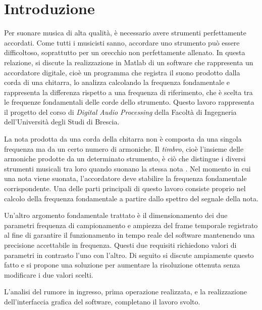 \chapter{Introduzione}

Per suonare musica di alta qualità, è necessario avere strumenti perfettamente accordati.
Come tutti i musicisti sanno, accordare uno strumento può essere difficoltoso, soprattutto per un orecchio non perfettamente allenato.
In questa relazione, si discute la realizzazione in Matlab di un software che rappresenta un accordatore digitale, cioè un programma che registra il suono prodotto dalla corda di una chitarra, lo analizza calcolando la frequenza fondamentale e rappresenta la differenza rispetto a una frequenza di riferimento, che è scelta tra le frequenze fondamentali delle corde dello strumento.
Questo lavoro rappresenta il progetto del corso di \emph{Digital Audio Processing} della Facoltà di Ingegneria dell'Università degli Studi di Brescia.

La nota prodotta da una corda della chitarra non è composta da una singola frequenza ma da un certo numero di armoniche. 
Il \emph{timbro}, cioè l'insieme delle armoniche prodotte da un determinato strumento, è ciò che distingue i diversi strumenti musicali tra loro quando suonano la stessa nota \cite{garzanti_timbro}.
Nel momento in cui una nota viene suonata, l'accordatore deve stabilire la frequenza fondamentale corrispondente.
Una delle parti principali di questo lavoro consiste proprio nel calcolo della frequenza fondamentale a partire dallo spettro del segnale della nota.

Un'altro argomento fondamentale trattato è il dimensionamento dei due parametri frequenza di campionamento e ampiezza del frame temporale registrato al fine di garantire il funzionamento in tempo reale del software mantenendo una precisione accettabile in frequenza.
Questi due requisiti richiedono valori di parametri in contrasto l'uno con l'altro.
Di seguito si discute ampiamente questo fatto e si propone una soluzione per aumentare la risoluzione ottenuta senza modificare i due valori scelti.

L'analisi del rumore in ingresso, prima operazione realizzata, e la realizzazione dell'interfaccia grafica del software, completano il lavoro svolto.
